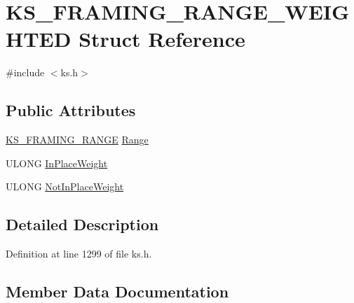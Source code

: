 \hypertarget{struct_k_s___f_r_a_m_i_n_g___r_a_n_g_e___w_e_i_g_h_t_e_d}{}\section{K\+S\+\_\+\+F\+R\+A\+M\+I\+N\+G\+\_\+\+R\+A\+N\+G\+E\+\_\+\+W\+E\+I\+G\+H\+T\+ED Struct Reference}
\label{struct_k_s___f_r_a_m_i_n_g___r_a_n_g_e___w_e_i_g_h_t_e_d}


{\ttfamily \#include $<$ks.\+h$>$}

\subsection*{Public Attributes}
\begin{DoxyCompactItemize}
\item 
\hyperlink{struct_k_s___f_r_a_m_i_n_g___r_a_n_g_e}{K\+S\+\_\+\+F\+R\+A\+M\+I\+N\+G\+\_\+\+R\+A\+N\+GE} \hyperlink{struct_k_s___f_r_a_m_i_n_g___r_a_n_g_e___w_e_i_g_h_t_e_d_a55d3e79af39381b05c100b5627cf31eb}{Range}
\item 
U\+L\+O\+NG \hyperlink{struct_k_s___f_r_a_m_i_n_g___r_a_n_g_e___w_e_i_g_h_t_e_d_ad4a6c1ca2a0c4d359227df608943fbce}{In\+Place\+Weight}
\item 
U\+L\+O\+NG \hyperlink{struct_k_s___f_r_a_m_i_n_g___r_a_n_g_e___w_e_i_g_h_t_e_d_af23bb8f865862ffe083460cc17c91589}{Not\+In\+Place\+Weight}
\end{DoxyCompactItemize}


\subsection{Detailed Description}


Definition at line 1299 of file ks.\+h.



\subsection{Member Data Documentation}

